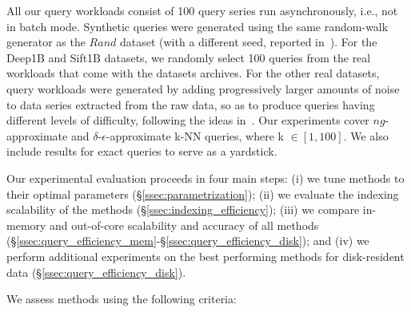{
All our query workloads consist of 100 query series run asynchronously, i.e., not in batch mode. 
Synthetic queries were generated using the same random-walk generator as the $Rand$ dataset (with a different seed, reported in~\cite{url/DSSeval2}). 
For the Deep1B and Sift1B datasets, we randomly select 100 queries from the real workloads that come with the datasets archives. For the other real datasets, query workloads were generated by adding progressively larger amounts of noise to data series extracted from the raw data, so as to produce queries having different levels of difficulty, following the ideas in~\cite{johannesjoural2018}. 
Our experiments cover $ng$-approximate and $\delta$-$\epsilon$-approximate k-NN queries, where k $\in [1,100]$. We also include results for exact queries to serve as a yardstick. 

{\color{black}Our experimental evaluation proceeds in four main steps: 
(i) we tune methods to their optimal parameters (\S\ref{ssec:parametrization}); (ii) we evaluate the indexing scalability of the methods
(\S\ref{ssec:indexing_efficiency}); (iii) we compare in-memory and out-of-core scalability and  accuracy of all methods (\S\ref{ssec:query_efficiency_mem}-\S\ref{ssec:query_efficiency_disk}); and (iv) we perform additional experiments on the best performing methods for disk-resident data (\S\ref{ssec:query_efficiency_disk})}. 


 We assess methods using the following criteria:

}
